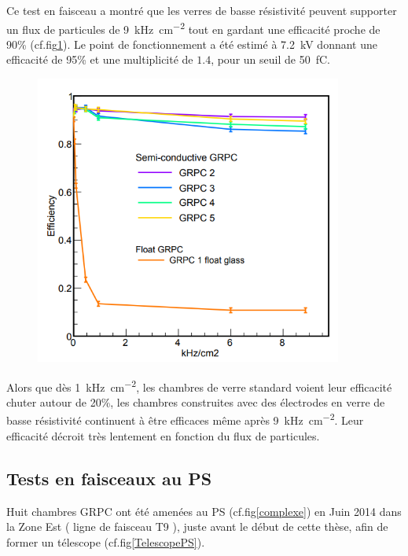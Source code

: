 Ce test en faisceau a montré que les verres de basse résistivité peuvent supporter un flux de particules de \SI{9}{\kilo\hertz\per\square\centi\meter} tout en gardant une efficacité proche de 90\% (cf.fig\ref{effiDesy}). Le point de fonctionnement a été estimé à \SI{7.2}{\kilo\volt} donnant une efficacité de 95\% et une multiplicité de $1.4$, pour un seuil de \SI{50}{\femto\coulomb}. 

\begin{figure}[ht!]
	\centering
	\includegraphics[width=0.9\textwidth]{GLA/effiDesy.png}
	\label{effiDesy}
\end{figure}

Alors que dès \SI{1}{\kilo\hertz\per\square\centi\meter}, les chambres de verre standard voient leur efficacité chuter autour de 20\%, les chambres construites avec des électrodes en verre de basse résistivité continuent à être efficaces même après \SI{9}{\kilo\hertz\per\square\centi\meter}. Leur efficacité décroit très lentement en fonction du flux de particules.

\subsection{Tests en faisceaux au PS}
Huit chambres GRPC ont été amenées au PS (cf.fig\ref{complexe}) en Juin \num{2014} dans la Zone Est ( ligne de faisceau T9 ), juste avant le début de cette thèse, afin de former un télescope (cf.fig\ref{TelescopePS}).

